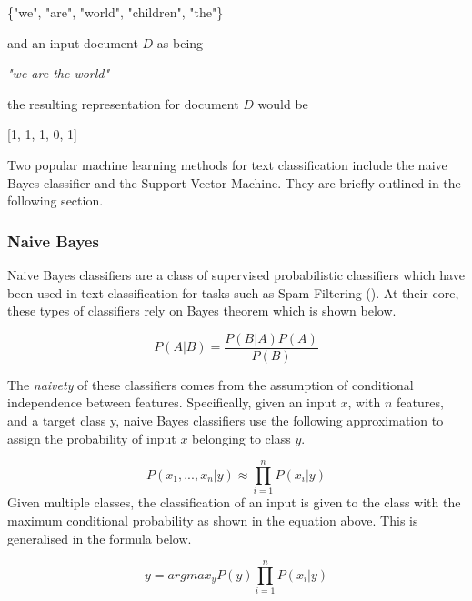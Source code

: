 \begin{center}
\{"we", "are", "world", "children", "the"\}
\end{center}

\noindent
\newline 
and an input document \(D\) as being 

\begin{center}
\textit{"we are the world"} 
\end{center}

\noindent
\newline
the resulting representation for document \(D\) would be

\begin{center}
 [1, 1, 1, 0, 1] 
\end{center}


\noindent
\newline
Two popular machine learning methods for text classification include the naive Bayes classifier and the Support Vector Machine. They are briefly outlined in the following section.

\subsubsection{Naive Bayes}
Naive Bayes classifiers are a class of supervised probabilistic classifiers which have been used in text classification for tasks such as Spam Filtering (\cite{Sahami1998}). At their core, these types of classifiers rely on Bayes theorem which is shown below.

\begin{equation}
P(A|B) = \dfrac{P(B|A)P(A)}{P(B)}
\end{equation}

\noindent
The \textit{naivety} of these classifiers comes from the assumption of conditional independence between features. Specifically, given an input \(x\), with \(n\) features, and a target class y, naive Bayes classifiers use the following approximation to assign the probability of input \(x\) belonging to class \(y\).

\begin{equation}
P(x_{1},...,x_{n}|y) \approx \prod_{i=1}^{n}P(x_{i} | y)
\end{equation}
\noindent
Given multiple classes, the classification of an input is given to the class with the maximum conditional probability as shown in the equation above. This is generalised in the formula below.

\begin{equation}
y = argmax_{y} P(y) \prod_{i=1}^{n}P(x_{i} | y)
\end{equation}

